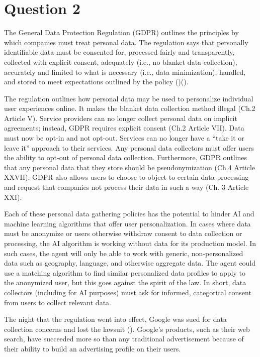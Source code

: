 \documentclass[
	letterpaper, %
]{jdf}
\begin{document}
\section{Question 2}
The General Data Protection Regulation (GDPR) outlines the principles by which companies must treat personal data. The regulation says that personally identifiable data must be consented for, processed fairly and transparently, collected with explicit consent, adequately (i.e., no blanket data-collection), accurately and limited to what is necessary (i.e., data minimization), handled, and stored to meet expectations outlined by the policy (\cite{european_parliament_general_2016})(\cite{davies_personalization_2018}). 

The regulation outlines how personal data may be used to personalize individual user experiences online. It makes the blanket data collection method illegal (Ch.2 Article V). Service providers can no longer collect personal data on implicit agreements; instead, GDPR requires explicit consent (Ch.2 Article VII). Data must now be opt-in and not opt-out. Services can no longer have a “take it or leave it” approach to their services. Any personal data collectors must offer users the ability to opt-out of personal data collection. Furthermore, GDPR outlines that any personal data that they store should be pseudonymization (Ch.4 Article XXVII). GDPR also allows users to choose to object to certain data processing and request that companies not process their data in such a way (Ch. 3 Article XXI).

Each of these personal data gathering policies has the potential to hinder AI and machine learning algorithms that offer user personalization. In cases where data must be anonymize or users otherwise withdraw consent to data collection or processing, the AI algorithm is working without data for its production model. In such cases, the agent will only be able to work with generic, non-personalized data such as geography, language, and otherwise aggregate data. The agent could use a matching algorithm to find similar personalized data profiles to apply to the anonymized user, but this goes against the spirit of the law. In short, data collectors (including for AI purposes) must ask for informed, categorical consent from users to collect relevant data. 

The night that the regulation went into effect, Google was sued for data collection concerns and lost the lawsuit (\cite{satariano_google_2019}). Google's products, such as their web search, have succeeded more so than any traditional advertisement because of their ability to build an advertising profile on their users.  
\end{document}
